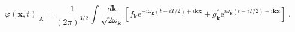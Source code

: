\begin{equation*}
\varphi(\boldsymbol{x},t)\bigg\vert_\mathrm{A} = \frac{1}{(2\pi)^{3/2}}\int 
\frac{d\boldsymbol{k}}{\sqrt{2 \omega_{\boldsymbol{k}}}} \left[
f_{\boldsymbol{k}} \mathrm{e}^{ - i \omega_{\boldsymbol{k}}(t - iT/2) + 
i\boldsymbol{kx}} + g_{\boldsymbol{k}}^* 
\mathrm{e}^{i \omega_{\boldsymbol{k}}(t - iT/2) - i\boldsymbol{kx}}\right]\;.
\end{equation*}

